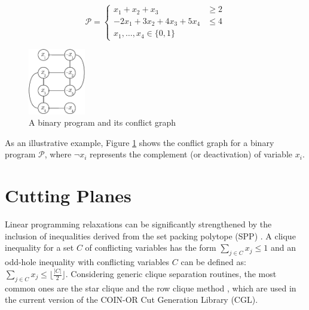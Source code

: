 \documentclass{endm}
\begin{document}
\begin{figure}
\begin{minipage}[b]{.5\textwidth}
\[
\mathcal{P} = \left\{
\begin{array}{lr}
x_1+x_2+x_3 & \geq 2 \\
-2x_{1}+3x_{2}+4x_{3}+5x_{4} & \leq 4 \\
x_{1},\ldots,x_{4}\in\{0,1\}
\end{array}
\right.
\]
\end{minipage}
\begin{minipage}{.5\textwidth}
	\centering
	\includegraphics[width=2.5cm]{cGraph.pdf}
\end{minipage}
\caption{A binary program and its conflict graph}\label{graph}
\end{figure}

As an illustrative example, Figure \ref{graph} shows the conflict graph for a binary program $\mathcal{P}$, where $\neg x_i$ represents the complement (or deactivation) of variable $x_i$.  

\section{Cutting Planes}\label{cut}

Linear programming relaxations can be significantly strengthened by the inclusion of inequalities derived from the set packing polytope (SPP) \cite {Padberg1973}. A clique inequality for a set $C$ of conflicting variables has the form $\sum_{j\in C}x_{j} \leq 1$ and an odd-hole inequality with conflicting variables $C$ can be defined as: $\sum_{j\in C}x_{j} \leq \lfloor \frac{|C|}{2}\rfloor$. Considering generic clique separation routines, the most common ones are the star clique and the row clique method \cite{Borndorfer1998}, which are used in the current version of the COIN-OR\cite{LougeeHeimer2003} Cut Generation Library (CGL).  
\end{document}
